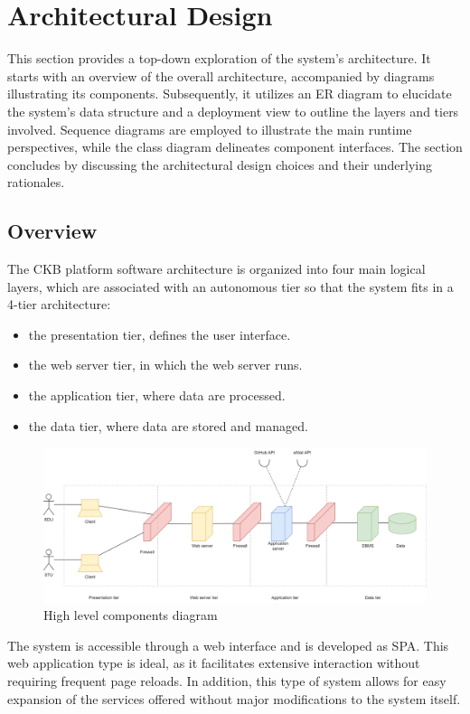 \chapter{Architectural Design}
This section provides a top-down exploration of the system's architecture. 
It starts with an overview of the overall architecture, accompanied by diagrams illustrating its components. 
Subsequently, it utilizes an ER diagram to elucidate the system's data structure and a deployment view to outline the layers and tiers involved. 
Sequence diagrams are employed to illustrate the main runtime perspectives, while the class diagram delineates component interfaces. 
The section concludes by discussing the architectural design choices and their underlying rationales.

\section{Overview}
The CKB platform software architecture is organized into four main logical layers, which are associated with an autonomous tier so that the system fits in a 4-tier architecture:
\begin{itemize}
    \item the presentation tier, defines the user interface.
    \item the web server tier, in which the web server runs.
    \item the application tier, where data are processed.
    \item the data tier, where data are stored and managed.
\end{itemize}

\begin{figure}[H]
    \centering
    \includegraphics[width=\textwidth]{images/diagrams/high_level_diagram.png}
    \caption{High level components diagram}
\end{figure}

The system is accessible through a web interface and is developed as SPA. 
This web application type is ideal, as it facilitates extensive interaction without requiring frequent page reloads. 
In addition, this type of system allows for easy expansion of the services offered without major modifications to the system itself. 

